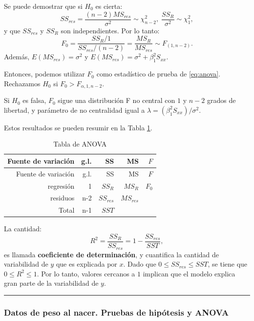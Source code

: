\documentclass[
]{article}
\begin{document}
Se puede demostrar que si \(H_{0}\) es cierta:
\[
SS_{res} = \frac{(n-2)MS_{res}}{\sigma^{2}} \sim \chi^{2}_{n-2} \mbox{,} \ \  \frac{SS_{R}}{\sigma^{2}} \sim \chi^{2}_{1},
\]
y que \(SS_{res}\) y \(SS_{R}\) son independientes. Por lo tanto:
\[
F_{0} = \frac{SS_{R}/1}{SS_{res}/(n-2)} = \frac{MS_{R}}{MS_{res}} \sim F_{(1,n-2)}.
\]
Además, \(E(MS_{res})=\sigma^{2}\) y \(E(MS_{res})=\sigma^{2} + \beta_{1}^{2}S_{xx}\).

Entonces, podemos utilizar \(F_{0}\) como estadístico de prueba de \eqref{eq:anova}. Rechazamos \(H_{0}\) si \(F_{0} > F_{\alpha,1,n-2}\).

Si \(H_{0}\) es falsa, \(F_{0}\) sigue una distribución F no central con \(1\) y \(n-2\) grados de libertad, y parámetro de no centralidad igual a \(\lambda=(\beta_{1}^{2}S_{xx})/\sigma^{2}\).

Estos resultados se pueden resumir en la Tabla \ref{tab:tableAnova}.

\begin{longtable}[]{@{}rrrrr@{}}
\caption{\label{tab:tableAnova} Tabla de ANOVA}\tabularnewline
\toprule
Fuente de variación & g.l. & SS & MS & \(F\) \\
\midrule
\endfirsthead
\toprule
Fuente de variación & g.l. & SS & MS & \(F\) \\
\midrule
\endhead
regresión & 1 & \(SS_{R}\) & \(MS_{R}\) & \(F_{0}\) \\
residuos & n-2 & \(SS_{res}\) & \(MS_{res}\) & \\
Total & n-1 & \(SST\) & & \\
\bottomrule
\end{longtable}

La cantidad:
\[
R^{2} = \frac{SS_{R}}{SS_{res}} = 1 - \frac{SS_{res}}{SST},
\]
es llamada \textbf{coeficiente de determinación}, y cuantifica la cantidad de variabilidad de \(y\) que es explicada por \(x\). Dado que \(0 \leq SS_{res} \leq SST\), se tiene que \(0 \leq R^{2} \leq 1\). Por lo tanto, valores cercanos a \(1\) implican que el modelo explica gran parte de la variabilidad de \(y\).

\rule{\textwidth}{0.4pt}

\hypertarget{datos-de-peso-al-nacer.-pruebas-de-hipuxf3tesis-y-anova}{%
\subsubsection*{Datos de peso al nacer. Pruebas de hipótesis y ANOVA}\label{datos-de-peso-al-nacer.-pruebas-de-hipuxf3tesis-y-anova}}
\end{document}
